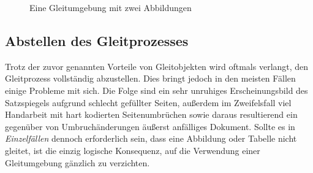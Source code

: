 \documentclass[%
  english,ngerman,%
  cdgeometry=no,DIV=12,automark,%
]{tudscrartcl}
\begin{document}
\begin{Trunk}
\begin{figure}
%
  {\caption{Eine Gleitumgebung mit zwei Abbildungen}\label{fig:logos}}%
\end{figure}

\end{Trunk}
\InputCode


\subsection{Abstellen des Gleitprozesses}
Trotz der zuvor genannten Vorteile von Gleitobjekten wird oftmals verlangt, den 
Gleitprozess vollständig abzustellen. Dies bringt jedoch in den meisten Fällen 
einige Probleme mit sich. Die Folge sind ein sehr unruhiges Erscheinungsbild 
des Satzspiegels aufgrund schlecht gefüllter Seiten, außerdem im Zweifelsfall 
viel Handarbeit mit hart kodierten Seitenumbrüchen sowie daraus resultierend 
ein gegenüber von Umbruchänderungen äußerst anfälliges Dokument. Sollte es in 
\emph{Einzelfällen} dennoch erforderlich sein, dass eine Abbildung oder Tabelle 
nicht gleitet, ist die einzig logische Konsequenz, auf die Verwendung einer 
Gleitumgebung gänzlich zu verzichten. 
\end{document}
